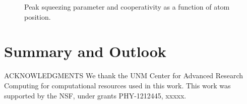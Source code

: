 \documentclass[preprint,aps,pra,onecolumn,superscriptaddress]{revtex4-1} %
\begin{document}
\newpage
\begin{figure}[htb]
\centering
 \begin{minipage}[h]{0.95\linewidth}
    \hfill
   \end{minipage}\vfill
   \begin{minipage}[h]{0.95\linewidth}
       \hfill
   \end{minipage}
\caption{Peak squeezing parameter and cooperativity as a function of atom position.}\label{fig:peakxi_rp_NA}
\end{figure}


\section{Summary and Outlook} \label{Sec::Conclusion}


ACKNOWLEDGMENTS
We thank the UNM Center for Advanced Research Computing for computational resources used in this work.
This work was supported by the NSF, under grants PHY-1212445, xxxxx.


\end{document}
